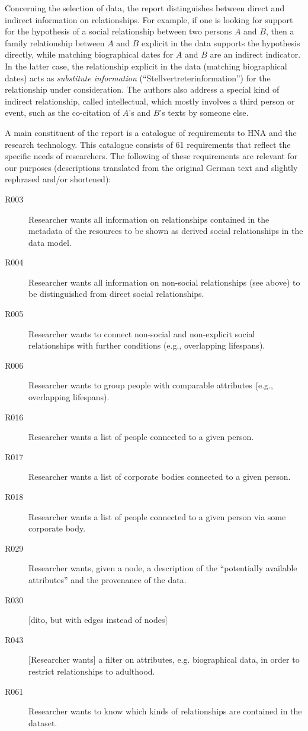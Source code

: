 
Concerning the selection of data, the report distinguishes between
direct and indirect information on relationships.
For example, if one is looking for support for the hypothesis of a social relationship
between two persons $A$ and $B$, then a family relationship between $A$ and $B$ explicit in the data
supports the hypothesis directly, while matching biographical dates for $A$ and $B$
are an indirect indicator. In the latter case, the relationship
explicit in the data (matching biographical dates) acts as \emph{substitute information}
(\enquote{Stellvertreterinformation}) for the relationship under consideration.
The authors also address a special kind of indirect relationship,
called intellectual, which mostly involves a third person
or event, such as the co-citation of $A$'s and $B$'s texts by someone else.

A main constituent of the report is a catalogue of requirements
to \gls{HNA} and the research technology. This catalogue consists of 61
requirements that reflect the specific needs of researchers.
The following of these requirements are relevant for our purposes
(descriptions translated from the original German text and slightly rephrased and/or shortened):
%
\begin{description}
  \item[R003]
    Researcher wants all information on relationships contained in the metadata of the resources
    to be shown as derived social relationships in the data model.
  \item[R004]
    Researcher wants all information on non-social
    relationships (see above) to be distinguished from direct social relationships.
  \item[R005]
    Researcher wants to connect non-social and non-explicit social relationships
    with further conditions (e.g., overlapping lifespans).
  \item[R006]
    Researcher wants to group people with comparable attributes (e.g., overlapping lifespans).
  \item[R016]
    Researcher wants a list of people connected to a given person.
  \item[R017]
    Researcher wants a list of corporate bodies connected to a given person.
  \item[R018]
    Researcher wants a list of people connected to a given person via some corporate body.
  \item[R029]
    Researcher wants, given a node, a description of the \enquote{potentially available attributes}
    and the provenance of the data.
  \item[R030]
    [dito, but with edges instead of nodes]
  \item[R043]
    [Researcher wants] a filter on attributes, e.g. biographical data, in order to
    restrict relationships to adulthood.
  \item[R061]
    Researcher wants to know which kinds of relationships are contained in the dataset.
\end{description}

